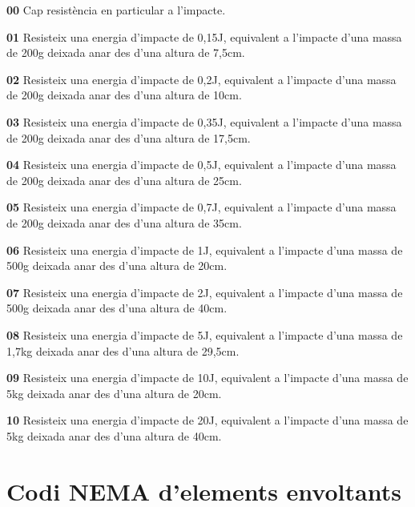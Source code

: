 \begin{list}{}
   {\setlength{\labelwidth}{10mm} \setlength{\leftmargin}{10mm} \setlength{\labelsep}{2mm}}
   \item[\textbf{00}] Cap resist\`{e}ncia en particular a l'impacte.
   \item[\textbf{01}] Resisteix una energia d'impacte de 0{,}15\unit{J}, equivalent a l'impacte d'una massa de 200\unit{g} deixada anar des d'una altura de 7{,}5\unit{cm}.
   \item[\textbf{02}] Resisteix una energia d'impacte de 0{,}2\unit{J}, equivalent a l'impacte d'una massa de 200\unit{g} deixada anar des d'una altura de 10\unit{cm}.
   \item[\textbf{03}] Resisteix una energia d'impacte de 0{,}35\unit{J}, equivalent a l'impacte d'una massa de 200\unit{g} deixada anar des d'una altura de 17{,}5\unit{cm}.
   \item[\textbf{04}] Resisteix una energia d'impacte de 0{,}5\unit{J}, equivalent a l'impacte d'una massa de 200\unit{g} deixada anar des d'una altura de 25\unit{cm}.
   \item[\textbf{05}] Resisteix una energia d'impacte de 0{,}7\unit{J}, equivalent a l'impacte d'una massa de 200\unit{g} deixada anar des d'una altura de 35\unit{cm}.
   \item[\textbf{06}]Resisteix una energia d'impacte de 1\unit{J}, equivalent a l'impacte d'una massa de 500\unit{g} deixada anar des d'una altura de 20\unit{cm}.
   \item[\textbf{07}]Resisteix una energia d'impacte de 2\unit{J}, equivalent a l'impacte d'una massa de 500\unit{g} deixada anar des d'una altura de 40\unit{cm}.
   \item[\textbf{08}]Resisteix una energia d'impacte de 5\unit{J}, equivalent a l'impacte d'una massa de 1{,}7\unit{kg} deixada anar des d'una altura de 29{,}5\unit{cm}.
   \item[\textbf{09}]Resisteix una energia d'impacte de 10\unit{J}, equivalent a l'impacte d'una massa de 5\unit{kg} deixada anar des d'una altura de 20\unit{cm}.
   \item[\textbf{10}]Resisteix una energia d'impacte de 20\unit{J}, equivalent a l'impacte d'una massa de 5\unit{kg} deixada anar des d'una altura de 40\unit{cm}.
\end{list}



\section{Codi NEMA d'elements envoltants}
 

